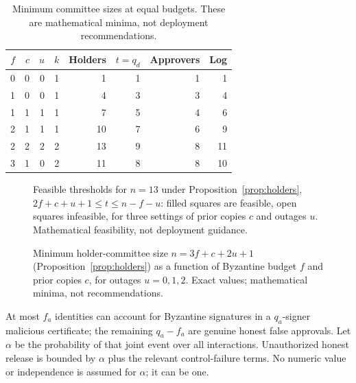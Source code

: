 \documentclass[pdflatex,sn-mathphys-num]{sn-jnl}
\theoremstyle{plain}
\theoremstyle{definition}
\begin{document}
\begin{table}[htbp]
\caption{Minimum committee sizes at equal budgets. These are mathematical minima, not deployment recommendations.}\label{tab:sensitivity}
\centering\small
\begin{tabular}{@{}rrrrrrrr@{}}\toprule
$f$&$c$&$u$&$k$&Holders&$t=q_d$&Approvers&Log\\\midrule
0&0&0&1&1&1&1&1\\
1&0&0&1&4&3&3&4\\
1&1&1&1&7&5&4&6\\
2&1&1&1&10&7&6&9\\
2&2&2&2&13&9&8&11\\
3&1&0&2&11&8&8&10\\\bottomrule
\end{tabular}
\end{table}

\begin{figure}[t]
\centering

\caption{Feasible thresholds for $n=13$ under Proposition~\ref{prop:holders}, $2f+c+u+1\le t\le n-f-u$: filled squares are feasible, open squares infeasible, for three settings of prior copies $c$ and outages $u$. Mathematical feasibility, not deployment guidance.}\label{fig:feasible}
\end{figure}

\begin{figure}[t]
\centering

\caption{Minimum holder-committee size $n=3f+c+2u+1$ (Proposition~\ref{prop:holders}) as a function of Byzantine budget $f$ and prior copies $c$, for outages $u=0,1,2$. Exact values; mathematical minima, not recommendations.}\label{fig:minholders}
\end{figure}

At most $f_a$ identities can account for Byzantine signatures in a $q_a$-signer malicious certificate; the remaining $q_a-f_a$ are genuine honest false approvals. Let $\alpha$ be the probability of that joint event over all interactions. Unauthorized honest release is bounded by $\alpha$ plus the relevant control-failure terms. No numeric value or independence is assumed for $\alpha$; it can be one.
\end{document}

